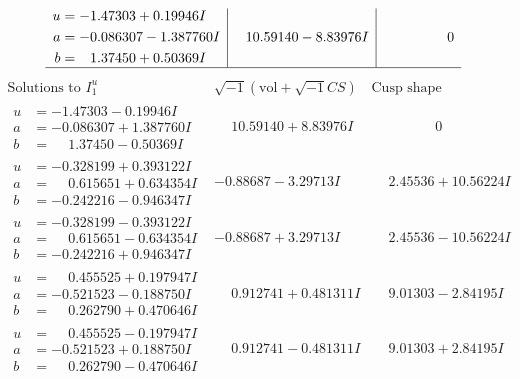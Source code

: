 \documentclass[1p]{elsarticle_modified}
\theoremstyle{definition}
\newcommand{\I}{\sqrt{-1}}
\begin{document}
$$\begin{array}{c|c|c}
\begin{aligned}
u &= -1.47303 + 0.19946 I \\
a &= -0.086307 - 1.387760 I \\
b &= \phantom{-}1.37450 + 0.50369 I\end{aligned}
 & \phantom{-}10.59140 - 8.83976 I & \phantom{-0.000000 } 0\\
 \hline 
 \end{array}$$\newpage$$\begin{array}{c|c|c}  
\text{Solutions to }I^u_{1}& \I (\text{vol} + \sqrt{-1}CS) & \text{Cusp shape}\\
 \hline 
\begin{aligned}
u &= -1.47303 - 0.19946 I \\
a &= -0.086307 + 1.387760 I \\
b &= \phantom{-}1.37450 - 0.50369 I\end{aligned}
 & \phantom{-}10.59140 + 8.83976 I & \phantom{-0.000000 } 0 \\ \hline\begin{aligned}
u &= -0.328199 + 0.393122 I \\
a &= \phantom{-}0.615651 + 0.634354 I \\
b &= -0.242216 - 0.946347 I\end{aligned}
 & -0.88687 - 3.29713 I & \phantom{-}2.45536 + 10.56224 I \\ \hline\begin{aligned}
u &= -0.328199 - 0.393122 I \\
a &= \phantom{-}0.615651 - 0.634354 I \\
b &= -0.242216 + 0.946347 I\end{aligned}
 & -0.88687 + 3.29713 I & \phantom{-}2.45536 - 10.56224 I \\ \hline\begin{aligned}
u &= \phantom{-}0.455525 + 0.197947 I \\
a &= -0.521523 - 0.188750 I \\
b &= \phantom{-}0.262790 + 0.470646 I\end{aligned}
 & \phantom{-}0.912741 + 0.481311 I & \phantom{-}9.01303 - 2.84195 I \\ \hline\begin{aligned}
u &= \phantom{-}0.455525 - 0.197947 I \\
a &= -0.521523 + 0.188750 I \\
b &= \phantom{-}0.262790 - 0.470646 I\end{aligned}
 & \phantom{-}0.912741 - 0.481311 I & \phantom{-}9.01303 + 2.84195 I \\ \hline\begin{aligned}

\end{aligned}
\end{array}$$
\end{document}
